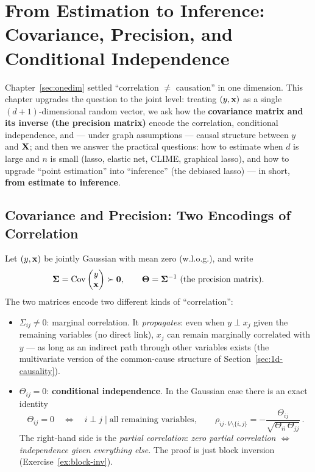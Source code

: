 \section[From estimation to inference]{From Estimation to Inference: Covariance, Precision, and Conditional Independence}\label{sec:ggm}

Chapter~\ref{sec:onedim} settled ``correlation $\neq$ causation'' in one dimension. This chapter upgrades the question to the joint level: treating $(y, \mathbf{x})$ as a single $(d{+}1)$-dimensional random vector, we ask how the \textbf{covariance matrix and its inverse (the precision matrix)} encode the correlation, conditional independence, and — under graph assumptions — causal structure between $y$ and $\mathbf{X}$; and then we answer the practical questions: how to estimate when $d$ is large and $n$ is small (lasso, elastic net, CLIME, graphical lasso), and how to upgrade ``point estimation'' into ``inference'' (the debiased lasso) — in short, \textbf{from estimate to inference}.

\subsection{Covariance and Precision: Two Encodings of Correlation}\label{sec:cov-prec}

Let $(y, \mathbf{x})$ be jointly Gaussian with mean zero (w.l.o.g.), and write
\[
  \bm{\Sigma} = \mathrm{Cov}\begin{pmatrix} y \\ \mathbf{x} \end{pmatrix} \succ \mathbf{0},
  \qquad
  \bm{\Theta} = \bm{\Sigma}^{-1} \ \text{(the precision matrix)}.
\]
The two matrices encode two different kinds of ``correlation'':

\begin{itemize}
  \item \textbf{$\Sigma_{ij} \neq 0$}: marginal correlation. It \textit{propagates}: even when $y \perp x_j$ given the remaining variables (no direct link), $x_j$ can remain marginally correlated with $y$ — as long as an indirect path through other variables exists (the multivariate version of the common-cause structure of Section~\ref{sec:1d-causality}).
  \item \textbf{$\Theta_{ij} = 0$}: \textbf{conditional independence}. In the Gaussian case there is an exact identity
  \begin{equation}\label{eq:ci-prec}
    \Theta_{ij} = 0
    \quad\Longleftrightarrow\quad
    i \perp j \mid \text{all remaining variables},
    \qquad
    \rho_{ij \cdot V \setminus \{i,j\}} = -\frac{\Theta_{ij}}{\sqrt{\Theta_{ii}\,\Theta_{jj}}} \, .
  \end{equation}
  The right-hand side is the \emph{partial correlation}: \textit{zero partial correlation $\Leftrightarrow$ independence given everything else.} The proof is just block inversion (Exercise~\ref{ex:block-inv}).
\end{itemize}

